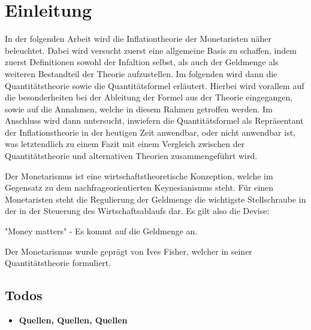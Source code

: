 \documentclass[
	12pt,
	BCOR=5mm,
	DIV=12,
	headinclude=on,
	footinclude=off,
	parskip=half,
	bibliography=totoc,
	listof=entryprefix,
	toc=listof,
	numbers=noenddot,
]{scrreprt}
\begin{document}


\tableofcontents

\listoffigures


\chapter{Einleitung}

\ihead{\chaptername~\thechapter}

In der folgenden Arbeit wird die Inflationtheorie der Monetaristen näher beleuchtet. Dabei wird versucht zuerst eine allgemeine Basis zu schaffen, indem zuerst Definitionen sowohl der Infaltion selbst, als auch der Geldmenge als weiteren Bestandteil der Theorie aufzustellen. Im folgenden wird dann die Quantitätstheorie sowie die Quantitätsformel erläutert. Hierbei wird vorallem auf die besonderheiten bei der Ableitung der Formel aus der Theorie eingegangen, sowie auf die Annahmen, welche in diesem Rahmen getroffen werden. Im Anschluss wird dann untersucht, inwiefern die Quantitätsformel als Repräsentant der Inflationstheorie in der heutigen Zeit anwendbar, oder nicht anwendbar ist, was letztendlich zu einem Fazit mit einem Vergleich zwischen der Quantitätstheorie und alternativen Theorien zusammengeführt wird.

Der Monetarismus ist eine wirtschaftstheoretische Konzeption, welche im Gegensatz zu dem nachfrageorientierten Keynesianismus steht. Für einen Monetaristen steht die Regulierung der Geldmenge die wichtigste Stellschraube in der in der Steuerung des Wirtschaftsablaufs dar. Es gilt also die Devise:

\begin{center}
    "Money matters" - Es kommt auf die Geldmenge an.
\end{center}

Der Monetarismus wurde geprägt von Ives Fisher, welcher in seiner Quantitätstheorie formuliert.


\section*{Todos}

\begin{itemize}
    \item \textbf{Quellen, Quellen, Quellen}
\end{itemize}

\printbibliography[title=Literaturverzeichnis]
\end{document}
